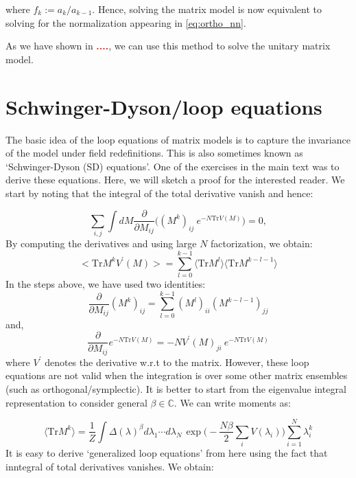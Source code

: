\documentclass[11pt]{article}
\newcommand{\TODO}[1]{\textcolor{red}{{\bf #1}}}
\begin{document}
where $f_{k} := a_{k}/a_{k-1}$. Hence, solving the matrix model is now equivalent to solving for the normalization appearing in \ref{eq:ortho_nn}. 

As we have shown in \TODO{....}, we can use this method to solve the unitary matrix model.


\section{Schwinger-Dyson/loop equations}
The basic idea of the loop equations of matrix models is to capture the invariance of the model under field redefinitions. This is also sometimes known as `Schwinger-Dyson (SD) equations'. One of the exercises in the main text was to derive these equations. Here, we will sketch a proof for the interested reader. We start by noting that the integral of the total derivative vanish and hence:

\begin{equation}
	\sum_{i,j} \int dM \frac{\partial}{\partial M_{ij}} \Bigg( (M^k)_{ij}~e^{-N\mathrm{Tr} V(M)}\Bigg) = 0, 
\end{equation}
By computing the derivatives and using large $N$ factorization, we obtain:
\begin{equation}
	\Big< \mathrm{Tr} M^{k} V^{\prime}(M) \Big> = \sum_{l=0}^{k-1} \langle \mathrm{Tr} M^{l} \rangle  \langle \mathrm{Tr} M^{k-l-1} \rangle
\end{equation}
In the steps above, we have used two identities:
\begin{equation}
	\frac{\partial}{\partial M_{ij}} (M^{k})_{ij} = \sum_{l=0}^{k-1} (M^{l})_{ii} (M^{k-l-1})_{jj}
\end{equation}
and, 
\begin{equation}
	\frac{\partial}{\partial M_{ij}} e^{-N\mathrm{Tr} V(M)} = -N V^{\prime}(M)_{ji}~e^{-N\mathrm{Tr} V(M)}
\end{equation}
where $V^{\prime}$ denotes the derivative w.r.t to the matrix. 
However, these loop equations are not valid when the integration is over some other matrix ensembles (such as orthogonal/symplectic). It is better to start from the eigenvalue integral representation to consider general $\beta \in \mathbb{C}$. We can write moments as:

\begin{equation} 
\langle \mbox{Tr} M^k  \rangle = \frac{1}{Z} \int \Delta(\lambda)^{\beta} 
	d\lambda_1 \cdots d\lambda_{N~} \exp\Bigg(-\frac{N\beta}{2} \sum_{i} V(\lambda_{i})\Bigg)  \sum_{i=1}^{N} \lambda_{i}^k
\end{equation}
It is easy to derive `generalized loop equations' from here using the fact that inntegral of total derivatives vanishes. We obtain:
\end{document}
